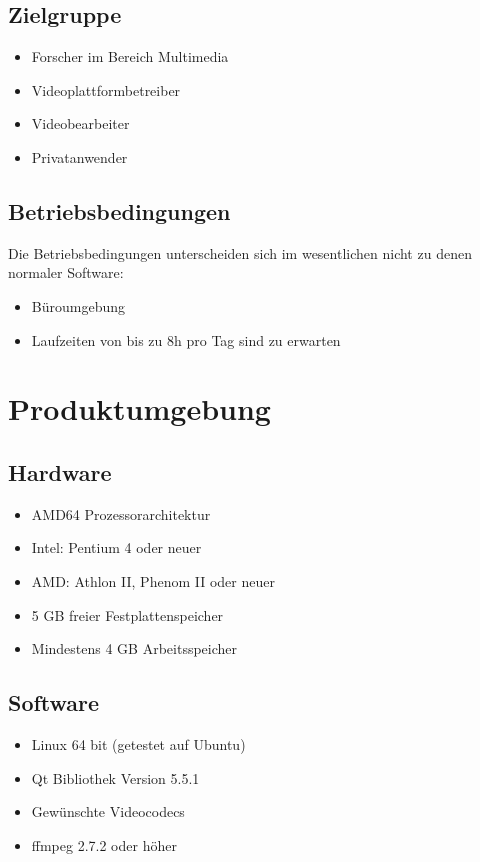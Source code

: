 \documentclass[parskip=full]{scrartcl}
\begin{document}
\subsection{Zielgruppe}
\begin{itemize}
\item Forscher im Bereich Multimedia
\item Videoplattformbetreiber
\item Videobearbeiter
\item Privatanwender
\end{itemize}
\subsection{Betriebsbedingungen}
Die Betriebsbedingungen unterscheiden sich im wesentlichen nicht zu denen normaler Software:
\begin{itemize}
\item Büroumgebung
\item Laufzeiten von bis zu 8h pro Tag sind zu erwarten
\end{itemize}
\newpage
\section{Produktumgebung}

\subsection{Hardware}
\begin{itemize}
\item AMD64 Prozessorarchitektur
\item Intel: Pentium 4 oder neuer
\item AMD: Athlon II, Phenom II oder neuer
\item 5 GB freier Festplattenspeicher
\item Mindestens 4 GB Arbeitsspeicher
\end{itemize}
\subsection{Software}
\begin{itemize}
\item Linux 64 bit (getestet auf Ubuntu)
\item Qt Bibliothek Version 5.5.1
\item Gewünschte Videocodecs
\item ffmpeg 2.7.2 oder höher
\end{itemize}
\newpage
\end{document}
